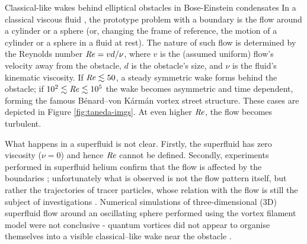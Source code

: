 \begin{chapter}{\label{cha:wake}Classical-like wakes behind elliptical obstacles in Bose-Einstein condensates}
In a classical viscous fluid \cite{Frisch}, the prototype problem with
a boundary is the flow 
around a cylinder or a sphere (or, changing the frame of reference, 
the motion of a cylinder or a sphere in a fluid at rest).
The nature of such flow is determined by the Reynolds 
number $\mbox{\ensuremath{\mathit{Re}}} = vd/\nu$, where $v$ is the (assumed uniform)
flow's velocity away from the obstacle, $d$ is the obstacle's size,
and $\nu$ is the fluid's
kinematic viscosity. If $\mbox{\ensuremath{\mathit{Re}}}\lesssim50$, a steady symmetric 
wake forms behind the obstacle; if $10^2\lesssim\mbox{\ensuremath{\mathit{Re}}}\lesssim10^5$ the wake 
becomes asymmetric and time dependent, forming the famous 
B\'enard--von K\'arm\'an vortex street structure.  These cases are depicted in Figure \ref{fig:taneda-imgs}.  At even higher $\mbox{\ensuremath{\mathit{Re}}}$,
the flow becomes turbulent. 

What happens in a superfluid is not clear. Firstly, the superfluid has
zero viscosity ($\nu=0$) and hence $\mbox{\ensuremath{\mathit{Re}}}$ cannot be defined. Secondly,
experiments performed in superfluid helium confirm that the flow is affected
by the boundaries \cite{VanSciver1999,VanSciver2005}; unfortunately 
what is observed is not the flow pattern itself, but rather the
trajectories of tracer particles, whose
relation with the flow is still the subject
of investigations \cite{sergeev09}. Numerical simulations of three-dimensional (3D) superfluid flow around
an oscillating sphere performed using the vortex filament model
were not conclusive - quantum vortices did not appear to organise themselves
into a visible classical--like wake near the obstacle \cite{Hanninen,Fujiyama,goto08}.


\end{chapter}
